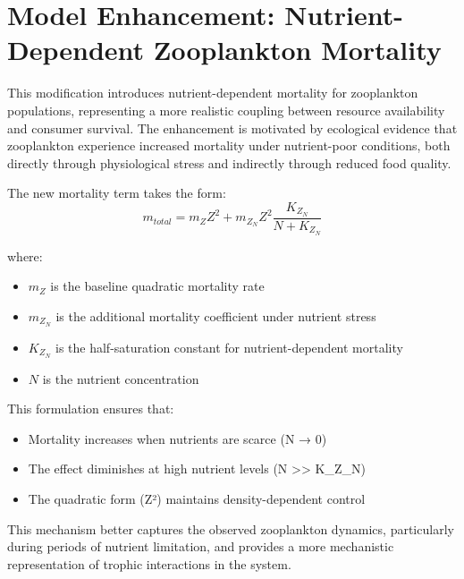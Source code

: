\section{Model Enhancement: Nutrient-Dependent Zooplankton Mortality}

This modification introduces nutrient-dependent mortality for zooplankton populations, representing a more realistic coupling between resource availability and consumer survival. The enhancement is motivated by ecological evidence that zooplankton experience increased mortality under nutrient-poor conditions, both directly through physiological stress and indirectly through reduced food quality.

The new mortality term takes the form:
\[
m_{total} = m_Z Z^2 + m_{Z_N} Z^2 \frac{K_{Z_N}}{N + K_{Z_N}}
\]

where:
\begin{itemize}
\item $m_Z$ is the baseline quadratic mortality rate
\item $m_{Z_N}$ is the additional mortality coefficient under nutrient stress
\item $K_{Z_N}$ is the half-saturation constant for nutrient-dependent mortality
\item $N$ is the nutrient concentration
\end{itemize}

This formulation ensures that:
\begin{itemize}
\item Mortality increases when nutrients are scarce (N → 0)
\item The effect diminishes at high nutrient levels (N >> K_{Z_N})
\item The quadratic form (Z²) maintains density-dependent control
\end{itemize}

This mechanism better captures the observed zooplankton dynamics, particularly during periods of nutrient limitation, and provides a more mechanistic representation of trophic interactions in the system.
